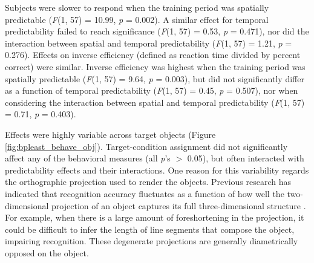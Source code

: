 \documentclass[dwyatte_dissertation.tex]{subfiles}
\begin{document}


Subjects were slower to respond when the training period was spatially predictable (\textit{F}(1, 57) = 10.99, \textit{p} = 0.002). A similar effect for temporal predictability failed to reach significance (\textit{F}(1, 57) = 0.53, \textit{p} = 0.471), nor did the interaction between spatial and temporal predictability (\textit{F}(1, 57) = 1.21, \textit{p} = 0.276). Effects on inverse efficiency (defined as reaction time divided by percent correct) were similar. Inverse efficiency was highest when the training period was spatially predictable (\textit{F}(1, 57) = 9.64, \textit{p} = 0.003), but did not significantly differ as a function of temporal predictability (\textit{F}(1, 57) = 0.45, \textit{p} = 0.507), nor when considering the interaction between spatial and temporal predictability (\textit{F}(1, 57) = 0.71, \textit{p} = 0.403).

Effects were highly variable across target objects (Figure \ref{fig:bpleast_behave_obj}). Target-condition assignment did not significantly affect any of the behavioral measures (all \textit{p}'s $>$ 0.05), but often interacted with predictability effects and their interactions. One reason for this variability regards the orthographic projection used to render the objects. Previous research has indicated that recognition accuracy fluctuates as a function of how well the two-dimensional projection of an object captures its full three-dimensional structure \cite{BalasSinha09b}. For example, when there is a large amount of foreshortening in the projection, it could be difficult to infer the length of line segments that compose the object, impairing recognition. These degenerate projections are generally diametrically opposed on the object. 
\end{document}

